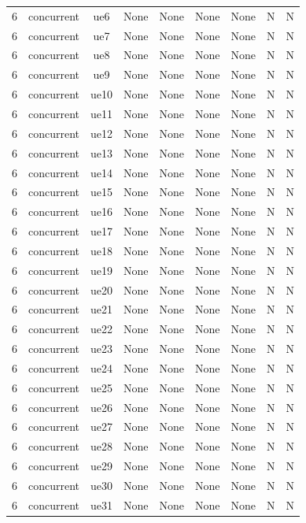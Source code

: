 \begin{table}[ht]
\begin{tabular}{|c|c|c|c|c|c|c|c|c|}
6 & concurrent & ue6 & None & None & None & None & N & N \\
6 & concurrent & ue7 & None & None & None & None & N & N \\
6 & concurrent & ue8 & None & None & None & None & N & N \\
6 & concurrent & ue9 & None & None & None & None & N & N \\
6 & concurrent & ue10 & None & None & None & None & N & N \\
6 & concurrent & ue11 & None & None & None & None & N & N \\
6 & concurrent & ue12 & None & None & None & None & N & N \\
6 & concurrent & ue13 & None & None & None & None & N & N \\
6 & concurrent & ue14 & None & None & None & None & N & N \\
6 & concurrent & ue15 & None & None & None & None & N & N \\
6 & concurrent & ue16 & None & None & None & None & N & N \\
6 & concurrent & ue17 & None & None & None & None & N & N \\
6 & concurrent & ue18 & None & None & None & None & N & N \\
6 & concurrent & ue19 & None & None & None & None & N & N \\
6 & concurrent & ue20 & None & None & None & None & N & N \\
6 & concurrent & ue21 & None & None & None & None & N & N \\
6 & concurrent & ue22 & None & None & None & None & N & N \\
6 & concurrent & ue23 & None & None & None & None & N & N \\
6 & concurrent & ue24 & None & None & None & None & N & N \\
6 & concurrent & ue25 & None & None & None & None & N & N \\
6 & concurrent & ue26 & None & None & None & None & N & N \\
6 & concurrent & ue27 & None & None & None & None & N & N \\
6 & concurrent & ue28 & None & None & None & None & N & N \\
6 & concurrent & ue29 & None & None & None & None & N & N \\
6 & concurrent & ue30 & None & None & None & None & N & N \\
6 & concurrent & ue31 & None & None & None & None & N & N \\

\end{tabular}
\end{table}
